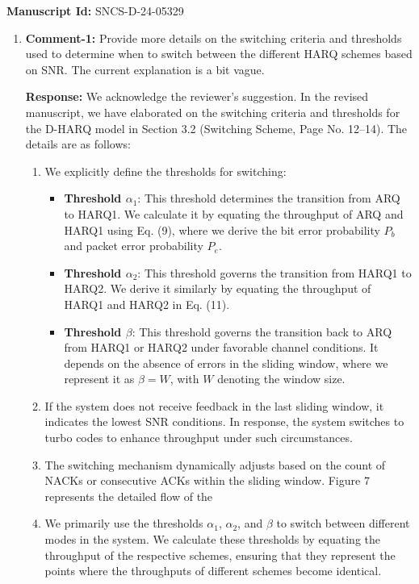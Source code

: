 \documentclass[a4paper,10pt]{article}
\begin{document}
\noindent \textbf{Manuscript Id:} SNCS-D-24-05329 \\

\begin{enumerate}

\item {\color{blue} \textbf{Comment-1:} Provide more details on the switching criteria and thresholds used to determine when to switch between the different HARQ schemes based on SNR. The current explanation is a bit vague.}

\textbf{Response:} We acknowledge the reviewer’s suggestion. In the revised manuscript, we have elaborated on the switching criteria and thresholds for the D-HARQ model in Section 3.2 (Switching Scheme, Page No. 12–14). The details are as follows:  

\begin{enumerate}  
    \item We explicitly define the thresholds for switching:  
    \begin{itemize}  
        \item \textbf{Threshold $\alpha_1$}: This threshold determines the transition from ARQ to HARQ1. We calculate it by equating the throughput of ARQ and HARQ1 using Eq. (9), where we derive the bit error probability $P_b$ and packet error probability $P_e$.  
        \item \textbf{Threshold $\alpha_2$}: This threshold governs the transition from HARQ1 to HARQ2. We derive it similarly by equating the throughput of HARQ1 and HARQ2 in Eq. (11).  
        \item \textbf{Threshold $\beta$}: This threshold governs the transition back to ARQ from HARQ1 or HARQ2 under favorable channel conditions. It depends on the absence of errors in the sliding window, where we represent it as $\beta = W$, with $W$ denoting the window size.  
    \end{itemize}  
    \item If the system does not receive feedback in the last sliding window, it indicates the lowest SNR conditions. In response, the system switches to turbo codes to enhance throughput under such circumstances.  
    \item The switching mechanism dynamically adjusts based on the count of NACKs or consecutive ACKs within the sliding window. Figure 7 represents the detailed flow of the
    \item We primarily use the thresholds \( \alpha_1 \), \( \alpha_2 \), and \( \beta \) to switch between different modes in the system. We calculate these thresholds by equating the throughput of the respective schemes, ensuring that they represent the points where the throughputs of different schemes become identical.  
\end{enumerate}  


\end{enumerate}
\end{document}
